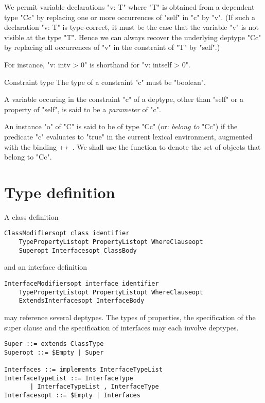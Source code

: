 We permit variable declarations \xcd"v: T" where \xcd"T" is obtained
from a dependent type \xcd"C{c}" by replacing one or more occurrences
of \xcd"self" in \xcd"c" by \xcd"v". (If such a declaration \xcd"v: T"
is type-correct, it must be the case that the variable \xcd"v" is not
visible at the type \xcd"T". Hence we can always recover the
underlying deptype \xcd"C{c}" by replacing all occurrences of \xcd"v"
in the constraint of \xcd"T" by \xcd"self".)

For instance, \xcd"v: int{v > 0}" is shorthand for \xcd"v: int{self > 0}".

\begin{staticrule}{Constraint type}
  The type of a constraint \xcd"c" must be \xcd"boolean".  
\end{staticrule}

A variable occuring in the constraint \xcd"c" of a deptype, other than
\xcd"self" or a property of \xcd"self", is said to be a {\em
parameter} of \xcd"c".\label{DepType:Parameter} 

An instance \xcd"o" of \xcd"C" is said to be of type \xcd"C{c}"
(or: {\em belong to}
\xcd"C{c}") if the predicate \xcd"c" evaluates to \xcd"true" in the current lexical
environment, augmented with the binding  $\mapsto$ . We shall
use the function  to denote the set of
objects that belong to \xcd"C{c}". 

\section{Type definition}\label{DepType:Class}
A class definition 
\begin{verbatim}
ClassModifiersopt class identifier 
    TypePropertyListopt PropertyListopt WhereClauseopt
    Superopt Interfacesopt ClassBody  
\end{verbatim}

\noindent and an interface definition
\begin{verbatim}
InterfaceModifiersopt interface identifier 
    TypePropertyListopt PropertyListopt WhereClauseopt
    ExtendsInterfacesopt InterfaceBody  
\end{verbatim}

\noindent may reference several deptypes. The types of properties, the
specification of the super clause and the specification of interfaces
may each involve deptypes.

\begin{verbatim}
Super ::= extends ClassType
Superopt ::= $Empty | Super

Interfaces ::= implements InterfaceTypeList
InterfaceTypeList ::= InterfaceType
       | InterfaceTypeList , InterfaceType
Interfacesopt ::= $Empty | Interfaces
\end{verbatim}

